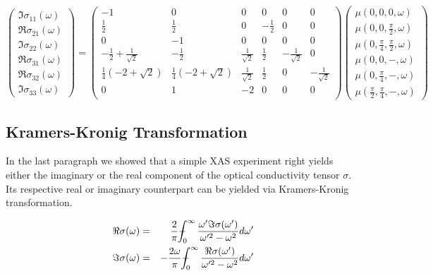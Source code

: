 \documentclass[twocolumn,prb,twocolumn,amsmath,superscriptaddress,nofootinbib,amssymb]{revtex4-1}
\def\Xint#1{\mathchoice
   {\XXint\displaystyle\textstyle{#1}}%
   {\XXint\textstyle\scriptstyle{#1}}%
   {\XXint\scriptstyle\scriptscriptstyle{#1}}%
   {\XXint\scriptscriptstyle\scriptscriptstyle{#1}}%
   \!\int}
\def\XXint#1#2#3{{\setbox0=\hbox{$#1{#2#3}{\int}$}
     \vcenter{\hbox{$#2#3$}}\kern-.5\wd0}}
\def\dashint{\Xint-}
\begin{document}
\begin{widetext}
\begin{equation}
\left(
\begin{array}{c}
\Im{\sigma _{11}(\omega)}  \\
\Re{\sigma _{21}(\omega)}   \\
\Im{\sigma _{22}(\omega)}   \\
\Re{\sigma _{31}(\omega)}   \\
  \Re{\sigma _{32}(\omega)}  \\
  \Im{\sigma _{33}(\omega)}
\end{array}
\right)
=
\left(
\begin{array}{cccccc}
-1 & 0 & 0 & 0 & 0 & 0 \\
\frac{1}{2} & \frac{1}{2} & 0 & -\frac{1}{2} & 0 & 0 \\
0 & -1 & 0 & 0 & 0 & 0 \\
-\frac{1}{2}+\frac{1}{\sqrt{2}} & -\frac{1}{2} & \frac{1}{\sqrt{2}} & \frac{1}{2} & -\frac{1}{\sqrt{2}} & 0 \\
\frac{1}{4} \left(-2+\sqrt{2}\right) & \frac{1}{4} \left(-2+\sqrt{2}\right) & \frac{1}{\sqrt{2}} & \frac{1}{2} & 0 & -\frac{1}{\sqrt{2}} \\
0 & 1 & -2 & 0 & 0 & 0 \\
\end{array}
\right)
\left(
\begin{array}{c}
\mu(0,0,0,\omega)  \\
\mu(0,0,\frac{\pi}{2},\omega)   \\
\mu(0,\frac{\pi}{4},\frac{\pi}{2},\omega)  \\
\mu(0,0,-,\omega)   \\
\mu(0,\frac{\pi}{4},-,\omega)  \\
\mu(\frac{\pi}{2},\frac{\pi}{4},-,\omega)
\end{array}
\right)
\end{equation}


\subsection{Kramers-Kronig Transformation}

In the last paragraph we showed that a simple XAS experiment right yields either the imaginary or the real component of the optical conductivity tensor $\sigma$. Its respective real or imaginary counterpart can be yielded via Kramers-Kronig transformation.

\begin{eqnarray}
\Re\sigma(\omega)&=&\frac{2}{\pi}\dashint_0^\infty \frac{\omega'\Im\sigma(\omega')}{\omega'^2-\omega^2}d\omega'\nonumber\\
\Im\sigma(\omega)&=&-\frac{2\omega}{\pi}\dashint_0^\infty \frac{\Re\sigma(\omega')}{\omega'^2-\omega^2}d\omega'\nonumber
\end{eqnarray}


\end{widetext}
\end{document}
